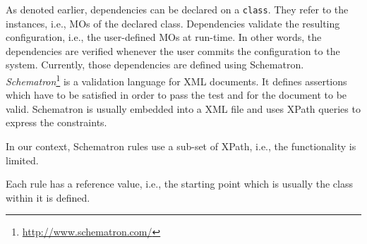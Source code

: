 As denoted earlier, dependencies can be declared on a \verb|class|. They refer to the instances, i.e., MOs of the declared class. Dependencies validate the resulting configuration, i.e., the user-defined MOs at run-time. In other words, the dependencies are verified whenever the user commits the configuration to the system. Currently, those dependencies are defined using Schematron. \\


\emph{Schematron}\footnote{\url{http://www.schematron.com/}} is a validation language for XML documents. It defines assertions which have to be satisfied in order to pass the test and for the document to be valid. Schematron is usually embedded into a XML file and uses XPath queries to express the constraints.

In our context, Schematron rules use a sub-set of XPath, i.e., the functionality is limited. 

Each rule has a reference value, i.e., the starting point which is usually the class within it is defined.


